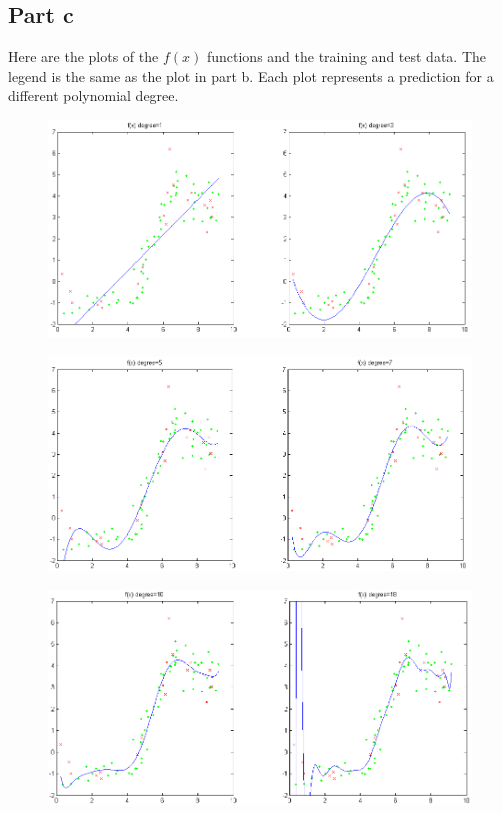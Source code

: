 \documentclass[twoside,11pt]{article}
\theoremstyle{definition}
\begin{document}
\newpage

\subsection*{Part c}


Here are the plots of the $f(x)$ functions and the training and test data. The legend is the same as the plot in part b. Each plot represents a prediction for a different polynomial degree.
\begin{figure}[h]
\centering
\includegraphics[width=\columnwidth]{prob1cPlotA1.png}
\end{figure}
\begin{figure}[h]
\centering
\includegraphics[width=\columnwidth]{prob1cPlotA2.png}
\end{figure}
\begin{figure}[h]
\centering
\includegraphics[width=\columnwidth]{prob1cPlotA3.png}
\end{figure}
\end{document}
